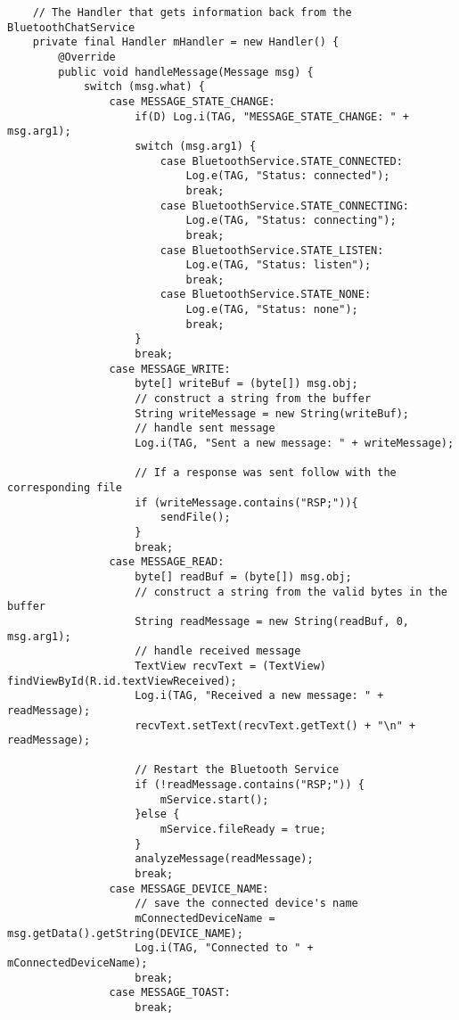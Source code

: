 \begin{verbatim}
    // The Handler that gets information back from the BluetoothChatService
    private final Handler mHandler = new Handler() {
        @Override
        public void handleMessage(Message msg) {
            switch (msg.what) {
                case MESSAGE_STATE_CHANGE:
                    if(D) Log.i(TAG, "MESSAGE_STATE_CHANGE: " + msg.arg1);
                    switch (msg.arg1) {
                        case BluetoothService.STATE_CONNECTED:
                            Log.e(TAG, "Status: connected");
                            break;
                        case BluetoothService.STATE_CONNECTING:
                            Log.e(TAG, "Status: connecting");
                            break;
                        case BluetoothService.STATE_LISTEN:
                            Log.e(TAG, "Status: listen");
                            break;
                        case BluetoothService.STATE_NONE:
                            Log.e(TAG, "Status: none");
                            break;
                    }
                    break;
                case MESSAGE_WRITE:
                    byte[] writeBuf = (byte[]) msg.obj;
                    // construct a string from the buffer
                    String writeMessage = new String(writeBuf);
                    // handle sent message
                    Log.i(TAG, "Sent a new message: " + writeMessage);

                    // If a response was sent follow with the corresponding file
                    if (writeMessage.contains("RSP;")){
                        sendFile();
                    }
                    break;
                case MESSAGE_READ:
                    byte[] readBuf = (byte[]) msg.obj;
                    // construct a string from the valid bytes in the buffer
                    String readMessage = new String(readBuf, 0, msg.arg1);
                    // handle received message
                    TextView recvText = (TextView) findViewById(R.id.textViewReceived);
                    Log.i(TAG, "Received a new message: " + readMessage);
                    recvText.setText(recvText.getText() + "\n" + readMessage);

                    // Restart the Bluetooth Service
                    if (!readMessage.contains("RSP;")) {
                        mService.start();
                    }else {
                        mService.fileReady = true;
                    }
                    analyzeMessage(readMessage);
                    break;
                case MESSAGE_DEVICE_NAME:
                    // save the connected device's name
                    mConnectedDeviceName = msg.getData().getString(DEVICE_NAME);
                    Log.i(TAG, "Connected to " + mConnectedDeviceName);
                    break;
                case MESSAGE_TOAST:
                    break;


\end{verbatim}
